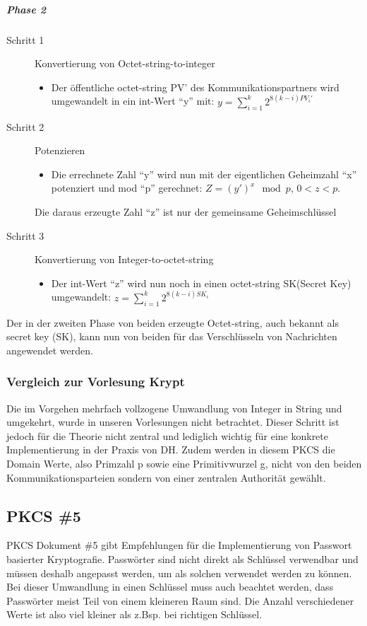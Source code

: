 \documentclass[10pt,a4paper]{article}
\begin{document}
\subparagraph{Phase 2}
\begin{description}
    \item[Schritt 1] Konvertierung von Octet-string-to-integer
        \begin{itemize}
            \item Der öffentliche octet-string PV' des Kommunikationspartners wird
                umgewandelt in ein int-Wert "`y"' mit: $y = \sum_{i=1}^k 2^{8(k-i) PV_i'}$
        \end{itemize}
    \item[Schritt 2] Potenzieren
        \begin{itemize}
            \item Die errechnete Zahl "`y"' wird nun mit der eigentlichen Geheimzahl "`x"'
                potenziert und mod "`p"' gerechnet: $Z = (y')^x \mod p$, $0 < z < p$.
        \end{itemize}
        Die daraus erzeugte Zahl "`z"' ist nur der gemeinsame Geheimschlüssel
    \item[Schritt 3] Konvertierung von Integer-to-octet-string
        \begin{itemize}
            \item Der int-Wert "`z"' wird nun noch in einen octet-string SK(Secret Key)
                umgewandelt: $z = \sum_{i=1}^k 2^{8(k-i)SK_i}$
        \end{itemize}
\end{description}

Der in der zweiten Phase von beiden erzeugte Octet-string, auch bekannt als secret key
(SK), kann nun von beiden für das Verschlüsseln von Nachrichten angewendet werden.

\subsubsection{Vergleich zur Vorlesung Krypt}
Die im Vorgehen mehrfach vollzogene Umwandlung von Integer in String und umgekehrt, wurde
in unseren Vorlesungen nicht betrachtet. Dieser Schritt ist jedoch für die Theorie nicht
zentral und lediglich wichtig für eine konkrete Implementierung in der Praxis von DH.
Zudem werden in diesem PKCS die Domain Werte, also Primzahl p sowie eine Primitivwurzel g,
nicht von den beiden Kommunikationsparteien sondern von einer zentralen Authorität
gewählt.

\subsection{PKCS \#5}
PKCS Dokument \#5 gibt Empfehlungen für die Implementierung von Passwort basierter
Kryptografie. Passwörter sind nicht direkt als Schlüssel verwendbar und müssen deshalb
angepasst werden, um als solchen verwendet werden zu können. Bei dieser Umwandlung in
einen Schlüssel muss auch beachtet werden, dass Passwörter meist Teil von einem kleineren
Raum sind. Die Anzahl verschiedener Werte ist also viel kleiner als z.Bsp. bei richtigen
Schlüssel.
\end{document}
